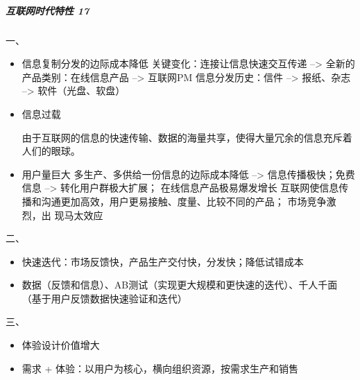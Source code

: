 \documentclass[letterpaper,11pt,english]{sphinxmanual}
\begin{document}
\subparagraph{互联网时代特性 17\sphinxfootnotemark[74]}
\label{\detokenize{chapter_introduction/AI_PM:id2}}%
\begin{footnotetext}[74]\sphinxAtStartFootnote
{}
%
\end{footnotetext}\ignorespaces 
一、
\begin{itemize}
\item {} 
信息复制分发的边际成本降低  关键变化：连接让信息快速交互传递 –>
全新的产品类别：在线信息产品 –> 互联网PM 信息分发历史：信件 –>
报纸、杂志 –> 软件（光盘、软盘）

\item {} 
信息过载
%
\begin{footnote}[75]\sphinxAtStartFootnote
{}
%
\end{footnote}
由于互联网的信息的快速传输、数据的海量共享，使得大量冗余的信息充斥着人们的眼球。

\item {} 
用户量巨大 多生产、多供给一份信息的边际成本降低 –>
信息传播极快；免费信息 –> 转化用户群极大扩展； 
在线信息产品极易爆发增长
互联网使信息传播和沟通更加高效，用户更易接触、度量、比较不同的产品；
市场竞争激烈，出 现马太效应

\end{itemize}

二、
\begin{itemize}
\item {} 
快速迭代：市场反馈快，产品生产交付快，分发快；降低试错成本

\item {} 
数据（反馈和信息）、AB测试（实现更大规模和更快速的迭代）、千人千面（基于用户反馈数据快速验证和迭代）

\end{itemize}

三、
\begin{itemize}
\item {} 
体验设计价值增大

\item {} 
需求 + 体验：以用户为核心，横向组织资源，按需求生产和销售

\end{itemize}
\end{document}
